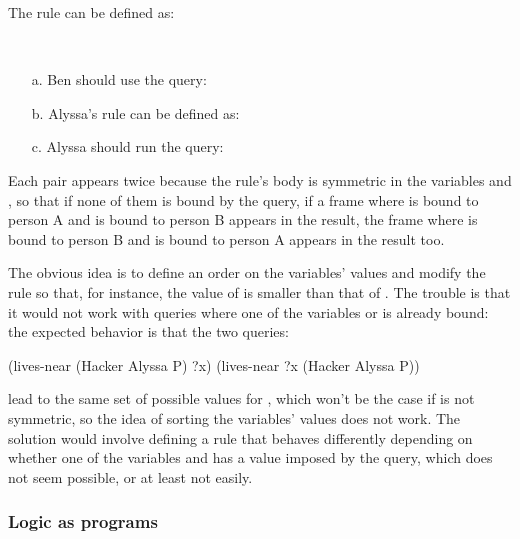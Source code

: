 \begin{exe}[4.58]
    The rule can be defined as:
\end{exe}

\begin{exe}[4.59]
    \ \vspace{-20pt}
    \begin{itemize}
        \item[a.] Ben should use the query:
        \item[b.] Alyssa’s rule can be defined as:
        \item[c.] Alyssa should run the query:
    \end{itemize}
\end{exe}

\begin{exe}[4.60]
    Each pair appears twice because the rule’s body is symmetric in the 
    variables  and , so that if none of them is 
    bound by the query, if a frame where  is bound to person 
    A and  is bound to person B appears in the result, the frame 
    where  is bound to person B and  is bound to 
    person A appears in the result too.

    The obvious idea is to define an order on the variables’ values and modify 
    the rule so that, for instance, the value of  is smaller 
    than that of . The trouble is that it would not work with 
    queries where one of the variables  or  is 
    already bound: the expected behavior is that the two queries:
    \begin{cscm}
        (lives-near (Hacker Alyssa P) ?x)
        (lives-near ?x (Hacker Alyssa P))
    \end{cscm}
    lead to the same set of possible values for , which won’t be the 
    case if  is not symmetric, so the idea of sorting the 
    variables’ values does not work. The solution would involve defining a rule 
    that behaves differently depending on whether one of the variables 
     and  has a value imposed by the query, 
    which does not seem possible, or at least not easily.
\end{exe}

\subsubsection{Logic as programs}

